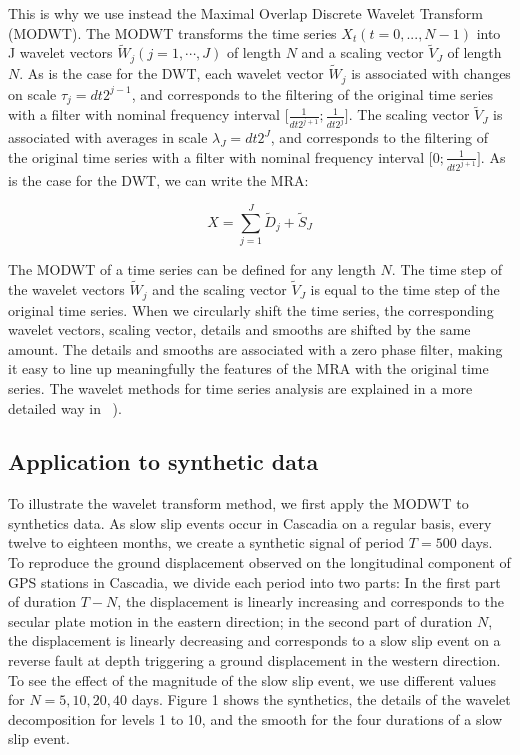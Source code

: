 \documentclass{article}
\begin{document}
This is why we use instead the Maximal Overlap Discrete Wavelet Transform (MODWT). The MODWT transforms the time series $X_t \left( t = 0, ... , N - 1 \right)$ into J wavelet vectors $\widetilde{W}_j \left( j = 1 ,  \cdots , J \right)$ of length $N$ and a scaling vector $\widetilde{V}_J$ of length $N$. As is the case for the DWT, each wavelet vector $\widetilde{W}_j$ is associated with changes on scale $\tau_j = dt 2^{j - 1}$, and corresponds to the filtering of the original time series with a filter with nominal frequency interval $\lbrack \frac{1}{dt 2^{j + 1}} ; \frac{1}{dt 2^j} \rbrack$. The scaling vector $\widetilde{V}_J$ is associated with averages in scale $\lambda_J = dt 2^J$, and corresponds to the filtering of the original time series with a filter with nominal frequency interval $\lbrack 0 ; \frac{1}{dt 2^{j + 1}} \rbrack$. As is the case for the DWT, we can write the MRA:

\begin{linenomath*}
\begin{equation}
X = \sum_{j = 1}^{J} \widetilde{D}_j + \widetilde{S}_J
\end{equation}
\end{linenomath*}

The MODWT of a time series can be defined for any length $N$. The time step of the wavelet vectors $\widetilde{W}_j$ and the scaling vector $\widetilde{V}_J$ is equal to the time step of the original time series. When we circularly shift the time series, the corresponding wavelet vectors, scaling vector, details and smooths are shifted by the same amount. The details and smooths are associated with a zero phase filter, making it easy to line up meaningfully the features of the MRA with the original time series. The wavelet methods for time series analysis are explained in a more detailed way in ~\citep{PER_2000}). \\

\subsection{Application to synthetic data}

To illustrate the wavelet transform method, we first apply the MODWT to synthetics data. As slow slip events occur in Cascadia on a regular basis, every twelve to eighteen months, we create a synthetic signal of period $T = 500$ days. To reproduce the ground displacement observed on the longitudinal component of GPS stations in Cascadia, we divide each period into two parts: In the first part of duration $T - N$, the displacement is linearly increasing and corresponds to the secular plate motion in the eastern direction; in the second part of duration $N$, the displacement is linearly decreasing and corresponds to a slow slip event on a reverse fault at depth triggering a ground displacement in the western direction. To see the effect of the magnitude of the slow slip event, we use different values for $N = 5, 10, 20, 40$ days. Figure 1 shows the synthetics, the details of the wavelet decomposition for levels 1 to 10, and the smooth for the four durations of a slow slip event. \\
\end{document}

